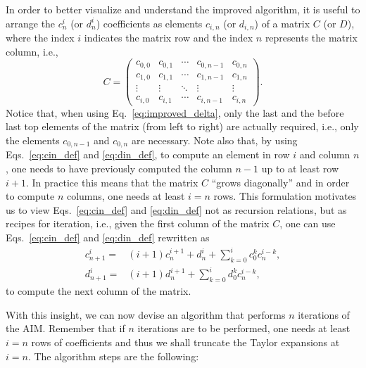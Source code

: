 In order to better visualize and understand the improved algorithm, it is useful to arrange the $c^i_n$ (or $d^i_n$) coefficients as elements $c_{i,n}$ (or $d_{i,n}$) of a matrix $C$ (or $D$), where the index $i$ indicates the matrix row and the index $n$ represents the matrix column, i.e.,
\begin{equation*}
  C =
  \begin{pmatrix}
    c_{0,0} & c_{0,1} & \cdots & c_{0,n-1} & c_{0,n} \\
    c_{1,0} & c_{1,1} & \cdots & c_{1,n-1} & c_{1,n} \\
    \vdots  & \vdots  & \ddots & \vdots    & \vdots  \\
    c_{i,0} & c_{i,1} & \cdots & c_{i,n-1} & c_{i,n}
  \end{pmatrix}
  .
  \label{eq:matrix_model_of_coeffs}
\end{equation*}
%
Notice that, when using Eq.~\eqref{eq:improved_delta}, only the last and the before last top elements of the matrix (from left to right) are actually required, i.e., only the elements $c_{0,n-1}$ and $c_{0,n}$ are necessary. Note also that, by using Eqs.~\eqref{eq:cin_def} and \eqref{eq:din_def},  to compute an element in row $i$ and column $n$, one needs to have previously computed the column $n-1$ up to at least row $i+1$. In practice this means that the matrix $C$ ``grows diagonally'' and in order to compute $n$ columns, one needs at least $i=n$ rows.  This formulation motivates us to view Eqs.~\eqref{eq:cin_def} and \eqref{eq:din_def} not as recursion relations, but as recipes for iteration, i.e., given the first column of the matrix $C$, one can use Eqs.~\eqref{eq:cin_def} and \eqref{eq:din_def} rewritten as
%
\begin{align}
  c^i_{n+1} = & (i+1)c^{i+1}_n + d^i_n + \sum_{k=0}^{i}c^k_0c^{i-k}_n, \label{eq:cin_iterative} \\
  d^i_{n+1} = & (i+1)d^{i+1}_n + \sum_{k=0}^{i}d^k_0c^{i-k}_n, \label{eq:din_iterative}
\end{align}
%
to compute the next column of the matrix.

With this insight, we can now devise an algorithm that performs $n$ iterations of the AIM. Remember that if $n$ iterations are to be performed, one needs at least $i=n$ rows of coefficients and thus we shall truncate the Taylor expansions at $i=n$. The algorithm steps are the following:

